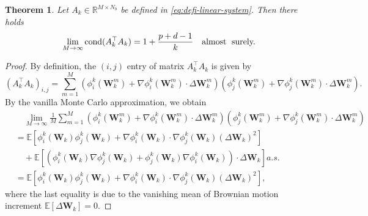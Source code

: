 \documentclass[10pt,a4paper]{amsart}
\numberwithin{equation}{section}
\numberwithin{algorithm}{section}
\theoremstyle{plain}
\newtheorem{theorem}{Theorem}[section]
\theoremstyle{remark}
\begin{document}
\begin{theorem}\label{thm:cond}
Let $A_k\in\mathbb{R}^{M\times N_b}$ be defined in \eqref{eq:defi-linear-system}. Then there holds
\begin{align*}
\lim_{M\to\infty}\operatorname{cond}(A_k^\top A_k)= 1+\frac{p+d-1}{k} \quad\text{almost\; surely.}
\end{align*}
\end{theorem}
\begin{proof}
By definition, the $(i,j)$ entry of matrix $A_k^\top A_k$ is given by 
\begin{equation} \label{eq:entry-matrix}
    (A_k^\top A_k)_{i,j} = \sum_{m=1}^M \left( \phi_i^k(\mathbf{W}_k^m) + \nabla \phi_i^k(\mathbf{W}_k^m)\cdot \Delta \mathbf{W}_k^m\right) \left( \phi_j^k(\mathbf{W}_k^m) + \nabla \phi_j^k(\mathbf{W}_k^m)\cdot \Delta \mathbf{W}_k^m\right).
\end{equation}
By the vanilla Monte Carlo approximation, we obtain 
\begin{align}
        &\quad \lim_{M\to\infty} \frac{1}{M}\sum_{m=1}^M \left( \phi_i^k(\mathbf{W}_k^m) + \nabla \phi_i^k(\mathbf{W}_k^m)\cdot \Delta \mathbf{W}_k^m\right) \left( \phi_j^k(\mathbf{W}_k^m) + \nabla \phi_j^k(\mathbf{W}_k^m)\cdot \Delta \mathbf{W}_k^m\right)\nonumber \\
        &= \mathbb{E}\left[ \phi_i^k(\mathbf{W}_k)\phi_j^k(\mathbf{W}_k) + \nabla \phi_i^k(\mathbf{W}_k)\cdot \nabla\phi_j^k(\mathbf{W}_k) (\Delta \mathbf{W}_k)^2 \right]\nonumber \\
        &\quad + \mathbb{E}\left[ \left(\phi_i^k(\mathbf{W}_k) \nabla\phi_j^k(\mathbf{W}_k) + \phi_j^k(\mathbf{W}_k) \nabla\phi_i^k(\mathbf{W}_k) \right)\cdot \Delta \mathbf{W}_k \right] a.s. \nonumber \\
        &=  \mathbb{E}\left[ \phi_i^k(\mathbf{W}_k)\phi_j^k(\mathbf{W}_k) + \nabla \phi_i^k(\mathbf{W}_k)\cdot\nabla\phi_j^k(\mathbf{W}_k) (\Delta \mathbf{W}_k)^2 \right],\label{eq:entry-form}
\end{align}
where the last equality is due to the vanishing mean of Brownian motion increment $\mathbb{E}[\Delta \mathbf{W}_k] = 0$.


\end{proof}
\end{document}
